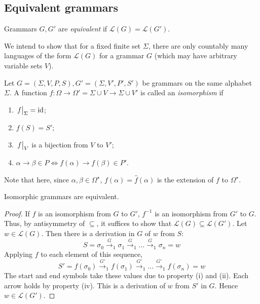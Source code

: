 \subsection{Equivalent grammars}
\begin{definition}
	Grammars \( G, G' \) are \emph{equivalent} if \( \mathcal L(G) = \mathcal L(G') \).
\end{definition}
We intend to show that for a fixed finite set \( \Sigma \), there are only countably many languages of the form \( \mathcal L(G) \) for a grammar \( G \) (which may have arbitrary variable sets \( V \)).
\begin{definition}
	Let \( G = (\Sigma, V, P, S), G' = (\Sigma, V', P', S') \) be grammars on the same alphabet \( \Sigma \).
	A function \( f \colon \Omega \to \Omega' = \Sigma \cup V \to \Sigma \cup V' \) is called an \emph{isomorphism} if
	\begin{enumerate}
		\item \( \eval{f}_\Sigma = \mathrm{id} \);
		\item \( f(S) = S' \);
		\item \( \eval{f}_V \) is a bijection from \( V \) to \( V' \);
		\item \( \alpha \to \beta \in P \iff f(\alpha) \to f(\beta) \in P' \).
	\end{enumerate}
	Note that here, since \( \alpha, \beta \in \Omega^\star \), \( f(\alpha) = \hat f(\alpha) \) is the extension of \( f \) to \( \Omega^\star \).
\end{definition}
\begin{proposition}
	Isomorphic grammars are equivalent.
\end{proposition}
\begin{proof}
	If \( f \) is an isomorphism from \( G \) to \( G' \), \( f^{-1} \) is an isomorphism from \( G' \) to \( G \).
	Thus, by antisymmetry of \( \subseteq \), it suffices to show that \( \mathcal L(G) \subseteq \mathcal L(G') \).
	Let \( w \in \mathcal L(G) \).
	Then there is a derivation in \( G \) of \( w \) from \( S \):
	\[ S = \sigma_0 \xrightarrow G_1 \sigma_1 \xrightarrow G_1 \dots \xrightarrow G_1 \sigma_n = w \]
	Applying \( f \) to each element of this sequence,
	\[ S' = f(\sigma_0) \xrightarrow {G'}_1 f(\sigma_1) \xrightarrow {G'}_1 \dots \xrightarrow {G'}_1 f(\sigma_n) = w \]
	The start and end symbols take these values due to property (i) and (ii).
	Each arrow holds by property (iv).
	This is a derivation of \( w \) from \( S' \) in \( G \).
	Hence \( w \in \mathcal L(G') \).
\end{proof}
